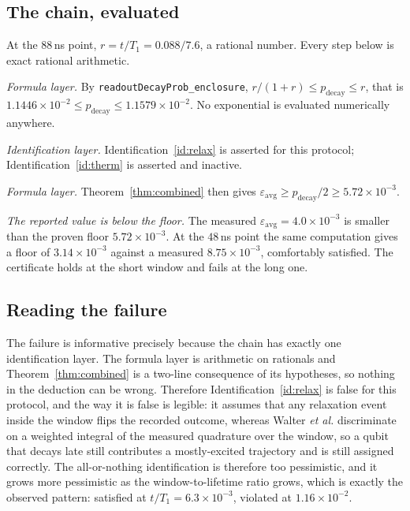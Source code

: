 \documentclass[aps,pra,reprint,nofootinbib,superscriptaddress]{revtex4-2}
\theoremstyle{plain}
\theoremstyle{definition}
\theoremstyle{remark}
\newcommand{\lean}[1]{\texttt{#1}}
\begin{document}
\subsection{The chain, evaluated}

At the $88$\,ns point, $r = t/T_1 = 0.088/7.6$, a rational number. Every
step below is exact rational arithmetic.

\emph{Formula layer.} By \lean{readoutDecayProb\_enclosure},
$r/(1+r) \le p_{\mathrm{decay}} \le r$, that is
$1.1446\times10^{-2} \le p_{\mathrm{decay}} \le 1.1579\times10^{-2}$. No
exponential is evaluated numerically anywhere.

\emph{Identification layer.} Identification~\ref{id:relax} is asserted
for this protocol; Identification~\ref{id:therm} is asserted and
inactive.

\emph{Formula layer.} Theorem~\ref{thm:combined} then gives
$\varepsilon_{\mathrm{avg}} \ge p_{\mathrm{decay}}/2 \ge
5.72\times10^{-3}$.

\emph{The reported value is below the floor.} The measured
$\varepsilon_{\mathrm{avg}} = 4.0\times10^{-3}$ is smaller than the
proven floor $5.72\times10^{-3}$. At the $48$\,ns point the same
computation gives a floor of $3.14\times10^{-3}$ against a measured
$8.75\times10^{-3}$, comfortably satisfied. The certificate holds at the
short window and fails at the long one.

\subsection{Reading the failure}

The failure is informative precisely because the chain has exactly one
identification layer. The formula layer is arithmetic on rationals and
Theorem~\ref{thm:combined} is a two-line consequence of its hypotheses,
so nothing in the deduction can be wrong. Therefore
Identification~\ref{id:relax} is false for this protocol, and the way it
is false is legible: it assumes that any relaxation event inside the
window flips the recorded outcome, whereas Walter \emph{et al.}
discriminate on a weighted integral of the measured quadrature over the
window, so a qubit that decays late still contributes a mostly-excited
trajectory and is still assigned correctly. The all-or-nothing
identification is therefore too pessimistic, and it grows more
pessimistic as the window-to-lifetime ratio grows, which is exactly the
observed pattern: satisfied at $t/T_1 = 6.3\times10^{-3}$, violated at
$1.16\times10^{-2}$.
\end{document}
